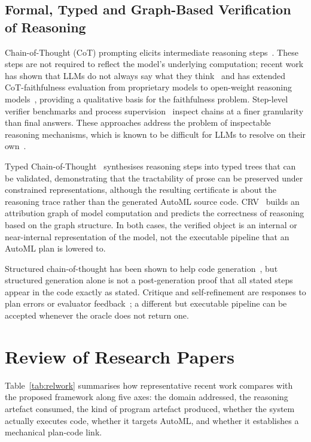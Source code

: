 \subsection{Formal, Typed and Graph-Based Verification of Reasoning}

Chain-of-Thought (CoT) prompting elicits intermediate reasoning
steps~\cite{wei2023cot}. These steps are not required to reflect the
model's underlying computation; recent work has shown that LLMs do
not always say what they think~\cite{turpin2023} and has extended
CoT-faithfulness evaluation from proprietary models to open-weight
reasoning models~\cite{young2026lie}, providing a qualitative basis
for the faithfulness problem. Step-level verifier benchmarks and
process supervision~\cite{jacovi2024chain, lightman2024} inspect
chains at a finer granularity than final answers. These approaches
address the problem of inspectable reasoning mechanisms, which is
known to be difficult for LLMs to resolve on their own~\cite{tyen2024}.

Typed Chain-of-Thought~\cite{perrier2025} synthesises reasoning
steps into typed trees that can be validated, demonstrating that the
tractability of prose can be preserved under constrained
representations, although the resulting certificate is about the
reasoning trace rather than the generated AutoML source code.
CRV~\cite{zhao2026crv} builds an attribution graph of model
computation and predicts the correctness of reasoning based on the
graph structure. In both cases, the verified object is an internal
or near-internal representation of the model, not the executable
pipeline that an AutoML plan is lowered to.

Structured chain-of-thought has been shown to help code
generation~\cite{li2025structured}, but structured generation alone
is not a post-generation proof that all stated steps appear in the
code exactly as stated. Critique and self-refinement are responses
to plan errors or evaluator feedback~\cite{selfrefine, critic}; a
different but executable pipeline can be accepted whenever the
oracle does not return one.

\section{Review of Research Papers}

Table~\ref{tab:relwork} summarises how representative recent work
compares with the proposed framework along five axes: the domain
addressed, the reasoning artefact consumed, the kind of program
artefact produced, whether the system actually executes code,
whether it targets AutoML, and whether it establishes a
mechanical plan-code link.

